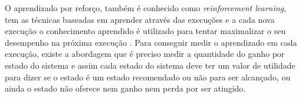 O aprendizado por reforço, também é conhecido como \textit{reinforcement learning}, tem as técnicas baseadas em  aprender através das execuções e a cada nova execução o conhecimento aprendido é utilizado para tentar maximalizar o seu desempenho na próxima execução \cite{intelligence2003modern}. Para conseguir medir o aprendizado em cada execução, existe a abordagem que é preciso medir a quantidade do ganho por estado do sistema e assim cada estado do sistema deve ter um valor de utilidade para dizer se o estado é um estado recomendado ou não para ser alcançado, ou ainda o estado não oferece nem ganho nem perda por ser atingido. \\ 



